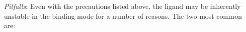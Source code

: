 \documentclass[12pt]{article}
\begin{document}
\textit{Pitfalls}:
Even with the precautions listed above, the ligand may be inherently unstable in the binding mode for a number of reasons. The two most common are: 
\end{document}
